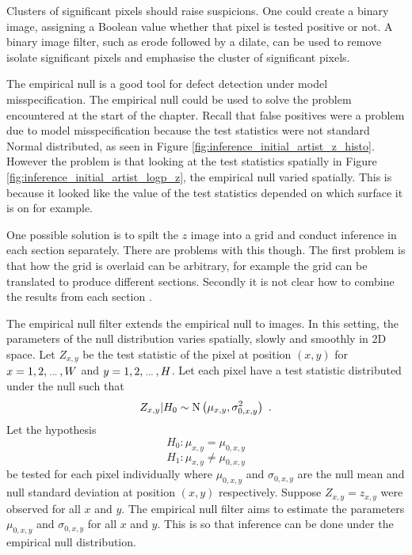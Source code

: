 Clusters of significant pixels should raise suspicions. One could create a binary image, assigning a Boolean value whether that pixel is tested positive or not. A binary image filter, such as erode followed by a dilate, can be used to remove isolate significant pixels and emphasise the cluster of significant pixels.

The empirical null is a good tool for defect detection under model misspecification. The empirical null could be used to solve the problem encountered at the start of the chapter. Recall that false positives were a problem due to model misspecification because the test statistics were not standard Normal distributed, as seen in Figure \ref{fig:inference_initial_artist_z_histo}. However the problem is that looking at the test statistics spatially in Figure \ref{fig:inference_initial_artist_logp_z}, the empirical null varied spatially. This is because it looked like the value of the test statistics depended on which surface it is on for example. 

One possible solution is to spilt the $z$ image into a grid and conduct inference in each section separately. There are problems with this though. The first problem is that how the grid is overlaid can be arbitrary, for example the grid can be translated to produce different sections. Secondly it is not clear how to combine the results from each section \citep{efron2008simultaneous}.

The empirical null filter extends the empirical null to images. In this setting, the parameters of the null distribution varies spatially, slowly and smoothly in 2D space. Let $Z_{x,y}$ be the test statistic of the pixel at position $(x,y)$ for $x=1,2,\dotdotdot,W$ and $y=1,2,\dotdotdot,H$. Let each pixel have a test statistic distributed under the null such that
\begin{equation}
	Z_{x,y}|H_0\sim\operatorname{N}\left(
		\mu_{x,y},\sigma_{0,x,y}^2
	\right)
	\ .
\end{equation}
Let the hypothesis
\begin{equation}
	H_0:\mu_{x,y}=\mu_{0,x,y}
\end{equation}
\begin{equation}
	H_1:\mu_{x,y}\neq\mu_{0,x,y}
\end{equation}
be tested for each pixel individually where $\mu_{0,x,y}$ and $\sigma_{0,x,y}$ are the null mean and null standard deviation at position $(x,y)$ respectively. Suppose $Z_{x,y}=z_{x,y}$ were observed for all $x$ and $y$. The empirical null filter aims to estimate the parameters $\mu_{0,x,y}$ and $\sigma_{0,x,y}$ for all $x$ and $y$. This is so that inference can be done under the empirical null distribution. 

